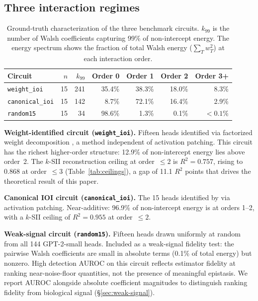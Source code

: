 \documentclass[10pt]{article}
\begin{document}
\subsection{Three interaction regimes}

\begin{table}[t]
\centering
\caption{Ground-truth characterization of the three benchmark circuits.
$k_{99}$ is the number of Walsh coefficients capturing 99\% of
non-intercept energy. The energy spectrum shows the fraction of total
Walsh energy ($\sum_T w_T^2$) at each interaction order.}
\label{tab:circuits}
\begin{tabular}{lrrrrrr}
\toprule
Circuit & $n$ & $k_{99}$ & Order 0 & Order 1 & Order 2 & Order 3+ \\
\midrule
\texttt{weight\_ioi} & 15 & 241 & 35.4\% & 38.3\% & 18.0\% & 8.3\% \\
\texttt{canonical\_ioi} & 15 & 142 & 8.7\% & 72.1\% & 16.4\% & 2.9\% \\
\texttt{random15} & 15 & 34 & 98.6\% & 1.3\% & 0.1\% & ${<}0.1\%$ \\
\bottomrule
\end{tabular}
\end{table}

\textbf{Weight-identified circuit (\texttt{weight\_ioi}).}
Fifteen heads identified via factorized weight decomposition
\citep{tower2026factorized}, a method independent of activation
patching. This circuit has the richest higher-order structure: 12.9\%
of non-intercept energy lies above order~2. The $k$-SII reconstruction
ceiling at order~$\leq 2$ is $R^2 = 0.757$, rising to $0.868$ at
order~$\leq 3$ (Table~\ref{tab:ceilings}), a gap of 11.1 $R^2$
points that drives the theoretical result of this paper.

\textbf{Canonical IOI circuit (\texttt{canonical\_ioi}).}
The 15 heads identified by \citet{wang2022interpretability} via
activation patching. Near-additive: 96.9\% of non-intercept energy
is at orders 1--2, with a $k$-SII ceiling of $R^2 = 0.955$ at
order~$\leq 2$.

\textbf{Weak-signal circuit (\texttt{random15}).}
Fifteen heads drawn uniformly at random from all 144 GPT-2-small
heads. Included as a weak-signal fidelity test: the pairwise Walsh
coefficients are small in absolute terms (0.1\% of total energy) but
nonzero. High detection AUROC on this circuit reflects estimator
fidelity at ranking near-noise-floor quantities, not the presence of
meaningful epistasis. We report AUROC alongside absolute coefficient
magnitudes to distinguish ranking fidelity from biological signal
(\S\ref{sec:weak-signal}).
\end{document}
